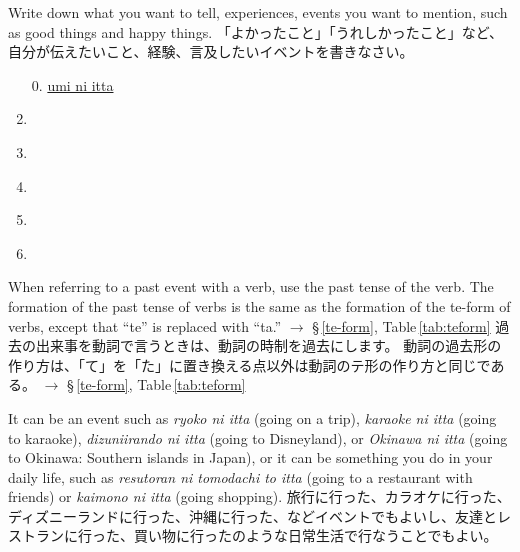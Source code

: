 \documentclass[uplatex,dvipdfmx,b5paper,english,10pt]{jsbook}
\begin{document}

\begin{toiquestion}
\ifEnglish
Write down what you want to tell, experiences, events you want to mention, such as good things and happy things.
\else
「よかったこと」「うれしかったこと」など、自分が伝えたいこと、経験、言及したいイベントを書きなさい。
\fi
\end{toiquestion}

\begin{enumerate}
  \item[0.] \underline{\hspace{1em}umi ni itta\hspace{18.2em}}
  \item \underline{\hspace{24em}}
  \item \underline{\hspace{24em}}
  \item \underline{\hspace{24em}}
  \item \underline{\hspace{24em}}
  \item \underline{\hspace{24em}}
\end{enumerate}

\begin{note}
\ifEnglish
When referring to a past event with a verb, use the past tense of the verb.
The formation of the past tense of verbs is the same as the formation of the te-form of verbs, except that ``te'' is replaced with ``ta.''
$\rightarrow$  \S\,\ref{te-form}, Table\,\ref{tab:teform}
\else
過去の出来事を動詞で言うときは、動詞の時制を過去にします。
動詞の過去形の作り方は、「て」を「た」に置き換える点以外は動詞のテ形の作り方と同じである。
$\rightarrow$ \S\,\ref{te-form}, Table\,\ref{tab:teform}
\fi
\end{note}

\begin{toianswer}
\ifEnglish
It can be an event such as {\it ryoko ni itta\/} (going on a trip), {\it karaoke ni itta\/} (going to karaoke), {\it dizuniirando ni itta\/} (going to Disneyland), or {\it Okinawa ni itta\/} (going to Okinawa: Southern islands in Japan), or it can be something you do in your daily life, such as {\it resutoran ni tomodachi to itta\/} (going to a restaurant with friends) or {\it kaimono ni itta\/} (going shopping).
\else
旅行に行った、カラオケに行った、ディズニーランドに行った、沖縄に行った、などイベントでもよいし、友達とレストランに行った、買い物に行ったのような日常生活で行なうことでもよい。
\fi
\end{toianswer}
\end{document}
